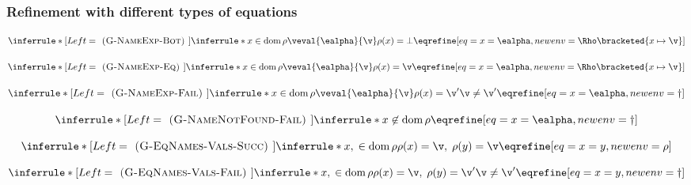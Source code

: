 \documentclass[]{article}
\DeclareMathOperator{\dom}{dom}
\begin{document}
\subsubsection{Refinement with different types of equations}

\[
\inferrule*[Left=\textsc{ (G-NameExp-Bot) }]
    {\inferrule* {}
    {
    x \in \dom \rho
    \\\\
    \veval{\ealpha}{\v}
    \\\\
    \rho(x) = \bot
    }}
    {\eqrefine[eq={x = \ealpha},newenv=\Rho\bracketed{x \mapsto \v}]}
\]

\[
\inferrule*[Left=\textsc{ (G-NameExp-Eq) }]
    {\inferrule* {}
    {
    x \in \dom \rho
    \\\\
    \veval{\ealpha}{\v}
    \\\\
    \rho(x) = \v
    }}
    {\eqrefine[eq={x = \ealpha},newenv=\Rho\bracketed{x \mapsto \v}]}
\]

\[
\inferrule*[Left=\textsc{ (G-NameExp-Fail) }]
    {\inferrule* {}
    {
    x \in \dom \rho
    \\\\
    \veval{\ealpha}{\v}
    \\\\ 
    \rho(x) = \v'
    \\\\
    \v \neq \v'
    }}
    {\eqrefine[eq={x = \ealpha},newenv=\dagger]}
\]

\[
\inferrule*[Left=\textsc{ (G-NameNotFound-Fail) }]
    {\inferrule* {}
    {
    x \not\in \dom \rho
    }}
    {\eqrefine[eq={x = \ealpha},newenv=\dagger]}
\]

\[
\inferrule*[Left=\textsc{ (G-EqNames-Vals-Succ) }]
    {\inferrule* {}
    {
    x,\;  \in \dom \rho
    \\\\
    \rho(x) = \v,\; \rho(y) = \v
    }}
    {\eqrefine[eq={x = y},newenv=\rho]}
\]

\[
\inferrule*[Left=\textsc{ (G-EqNames-Vals-Fail) }]
    {\inferrule* {}
    {
    x,\;  \in \dom \rho
    \\\\
    \rho(x) = \v,\; \rho(y) = \v'
    \\\\
    \v \neq \v'}}
    {\eqrefine[eq={x = y},newenv=\dagger]}
\]

\end{document}
